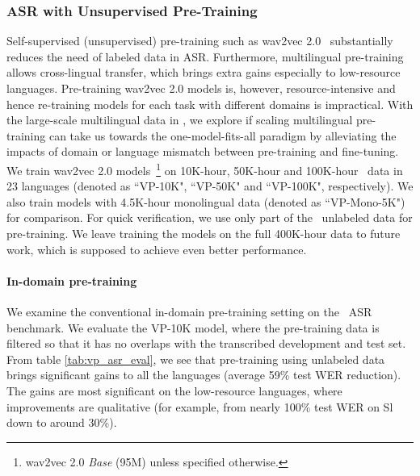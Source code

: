 \subsubsection{ASR with Unsupervised Pre-Training}
\label{sec:unsupervised_pretraining}
Self-supervised (unsupervised) pre-training such as wav2vec 2.0~\citep{baevski2020wav2vec} substantially reduces the need of labeled data in ASR. Furthermore, multilingual pre-training~\citep{conneau2020unsupervised} allows cross-lingual transfer, which brings extra gains especially to low-resource languages. Pre-training wav2vec 2.0 models is, however, resource-intensive and hence re-training models for each task with different domains is impractical. With the large-scale multilingual data in \vp,
we explore if scaling multilingual pre-training can take us towards the one-model-fits-all paradigm by alleviating the impacts of domain or language mismatch between pre-training and fine-tuning. We train wav2vec 2.0 models~\footnote{wav2vec 2.0 \emph{Base} (95M) unless specified otherwise.} on 10K-hour, 50K-hour and 100K-hour \vp~data in 23 languages (denoted as ``VP-10K", ``VP-50K" and ``VP-100K", respectively). We also train models with 4.5K-hour monolingual data (denoted as ``VP-Mono-5K") for comparison. For quick verification, we use only part of the \vp~unlabeled data for pre-training. We leave training the models on the full 400K-hour data to future work, which is supposed to achieve even better performance.

\paragraph{In-domain pre-training} We examine the conventional in-domain pre-training setting on the \vp~ASR benchmark. We evaluate the VP-10K model, where the pre-training data is filtered so that it has no overlaps with the transcribed development and test set. From table \ref{tab:vp_asr_eval}, we see that pre-training using unlabeled data brings significant gains to all the languages (average 59\% test WER reduction). The gains are most significant on the low-resource languages, where improvements are qualitative (for example, from nearly 100\% test WER on Sl down to around 30\%).

